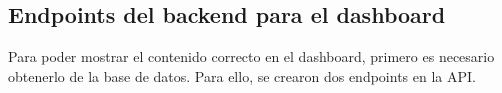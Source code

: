 \subsection{Endpoints del backend para el dashboard}
Para poder mostrar el contenido correcto en el dashboard, primero es necesario obtenerlo de la base de datos. Para ello, se crearon dos endpoints en la API.
    
    